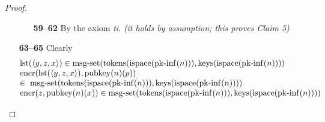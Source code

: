 \documentclass[11pt]{article}
\theoremstyle{plain}
\begin{document}
\begin{proof}
\begin{itemize}[leftmargin=2.8em, itemsep=4pt, parsep=1pt]
  \begin{itemize}[leftmargin=2.8em, itemsep=4pt, parsep=1pt]
  \item[\textbf{59--62}] By the axiom \emph{ti}.  \emph{(it holds by assumption; this proves Claim 5)}
  \end{itemize}
  \item[\textbf{63--65}] Clearly
\begin{equation*}
\begin{array}{@{}l@{}}
\operatorname{lst}(\langle y, z, x \rangle) \in \operatorname{msg\text{-}set}(\operatorname{tokens}(\operatorname{ispace}(\operatorname{pk\text{-}inf}(n))), \operatorname{keys}(\operatorname{ispace}(\operatorname{pk\text{-}inf}(n)))) \\
\begin{array}{@{}l@{}} \operatorname{encr}(\operatorname{lst}(\langle y, z, x \rangle), \operatorname{pubkey}(n)(p)) \\ \in\; \operatorname{msg\text{-}set}(\operatorname{tokens}(\operatorname{ispace}(\operatorname{pk\text{-}inf}(n))), \operatorname{keys}(\operatorname{ispace}(\operatorname{pk\text{-}inf}(n)))) \end{array} \\
\operatorname{encr}(z, \operatorname{pubkey}(n)(x)) \in \operatorname{msg\text{-}set}(\operatorname{tokens}(\operatorname{ispace}(\operatorname{pk\text{-}inf}(n))), \operatorname{keys}(\operatorname{ispace}(\operatorname{pk\text{-}inf}(n))))
\end{array}
\end{equation*}


\end{itemize}
\end{proof}
\end{document}
